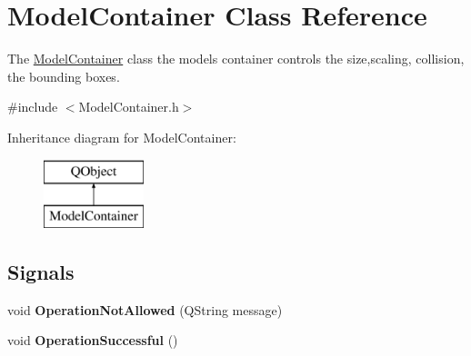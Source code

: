\hypertarget{class_model_container}{}\section{Model\+Container Class Reference}
\label{class_model_container}


The \hyperlink{class_model_container}{Model\+Container} class the model\textquotesingle{}s container controls the size,scaling, collision, the bounding boxes.  




{\ttfamily \#include $<$Model\+Container.\+h$>$}

Inheritance diagram for Model\+Container\+:\begin{figure}[H]
\begin{center}
\leavevmode
\includegraphics[height=2.000000cm]{class_model_container}
\end{center}
\end{figure}
\subsection*{Signals}
\begin{DoxyCompactItemize}
\item 
\hypertarget{class_model_container_a313ffe5493b9ed80d7a525f8530ff5f5}{}void {\bfseries Operation\+Not\+Allowed} (Q\+String message)\label{class_model_container_a313ffe5493b9ed80d7a525f8530ff5f5}

\item 
\hypertarget{class_model_container_af965a24540959f575f98f154269fafd6}{}void {\bfseries Operation\+Successful} ()\label{class_model_container_af965a24540959f575f98f154269fafd6}

\end{DoxyCompactItemize}

